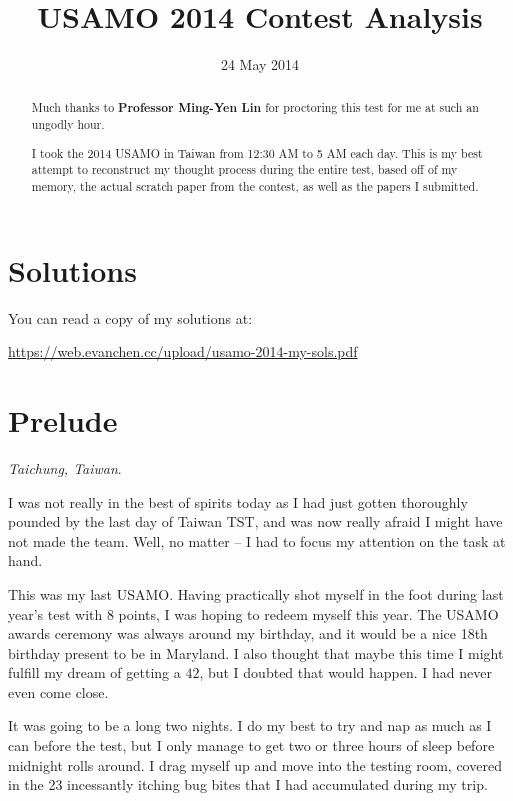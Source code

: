 \documentclass[11pt]{scrartcl}
\begin{document}
\title{USAMO 2014 Contest Analysis}
\date{24 May 2014}
\maketitle

\begin{abstract}
  Much thanks to \textbf{Professor Ming-Yen Lin}
  for proctoring this test for me at such an ungodly hour.

  I took the 2014 USAMO in Taiwan
  from 12:30 AM to 5 AM each day.
  This is my best attempt to reconstruct my thought process
  during the entire test, based off of my memory,
  the actual scratch paper from the contest,
  as well as the papers I submitted.
\end{abstract}

\tableofcontents
\section*{Solutions}
You can read a copy of my solutions at:
\begin{center}
  \url{https://web.evanchen.cc/upload/usamo-2014-my-sols.pdf}
\end{center}
\eject

\section{Prelude}
\emph{Taichung, Taiwan}.

I was not really in the best of spirits today as I had just gotten thoroughly
pounded by the last day of Taiwan TST, and was now really afraid I might have not made the team.
Well, no matter -- I had to focus my attention on the task at hand.

This was my last USAMO. Having practically shot myself in the foot during last year's test with 8 points,
I was hoping to redeem myself this year.
The USAMO awards ceremony was always around my birthday,
and it would be a nice 18th birthday present to be in Maryland.
I also thought that maybe this time I might fulfill my dream of getting a $42$,
but I doubted that would happen. I had never even come close.

It was going to be a long two nights.
I do my best to try and nap as much as I can before the test,
but I only manage to get two or three hours of sleep before midnight rolls around.
I drag myself up and move into the testing room,
covered in the 23 incessantly itching bug bites that I had accumulated during my trip.
\end{document}
